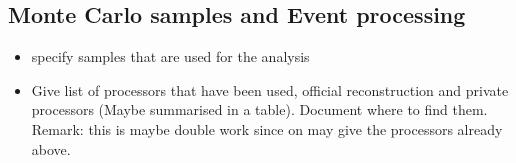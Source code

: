 \documentclass[preprint]{elsarticle}
\newcommand{\ecal}{Si-W ECAL}
\newcommand{\ecalp}{\ecal\ physics prototype}
\begin{document}








\subsection{ Monte Carlo samples and Event processing}
\begin{itemize}
\item specify samples that are used for the analysis
\item Give list of processors that have been used, official reconstruction and private processors (Maybe summarised in a table). Document where to find them. Remark: this is maybe double work since on may give the processors already above.
\end{itemize}
\end{document}
